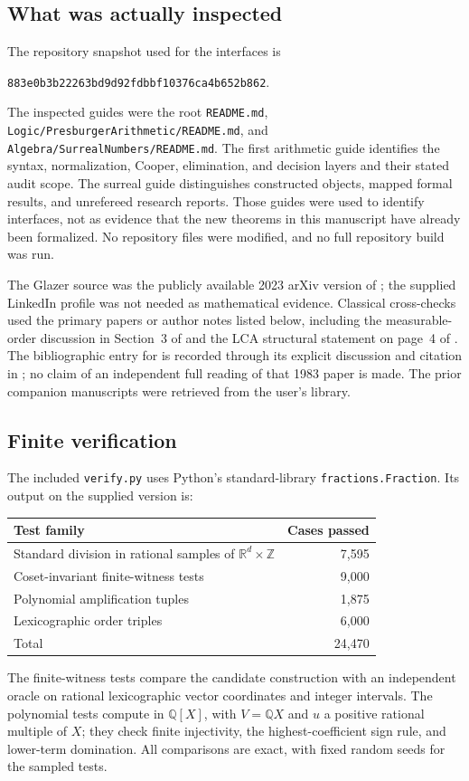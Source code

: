 \documentclass[11pt]{article}
\numberwithin{equation}{section}
\theoremstyle{definition}
\theoremstyle{remark}
\newcommand{\Z}{\mathbb Z}
\newcommand{\Q}{\mathbb Q}
\newcommand{\R}{\mathbb R}
\begin{document}
\subsection{What was actually inspected}
The repository snapshot used for the interfaces is
\begin{center}
\texttt{883e0b3b22263bd9d92fdbbf10376ca4b652b862}.
\end{center}
The inspected guides were the root \texttt{README.md},
\texttt{Logic/PresburgerArithmetic/README.md}, and
\texttt{Algebra/SurrealNumbers/README.md}. The first arithmetic guide
identifies the syntax, normalization, Cooper, elimination, and decision
layers and their stated audit scope. The surreal guide distinguishes
constructed objects, mapped formal results, and unrefereed research
reports. Those guides were used to identify interfaces, not as evidence
that the new theorems in this manuscript have already been formalized.
No repository files were modified, and no full repository build was run.

The Glazer source was the publicly available 2023 arXiv version of
\cite{Glazer}; the supplied LinkedIn profile was not needed as mathematical
evidence. Classical cross-checks used the primary papers or author notes
listed below, including the measurable-order discussion in Section~3
of \cite{AsmarMS} and the LCA structural statement on page~4 of
\cite{Dobben}. The bibliographic entry for \cite{HewittKoshi} is recorded
through its explicit discussion and citation in \cite{AsmarMS}; no
claim of an independent full reading of that 1983 paper is made.
The prior companion manuscripts were retrieved from the user's library.

\subsection{Finite verification}
The included \texttt{verify.py} uses Python's standard-library
\texttt{fractions.Fraction}. Its output on the supplied version is:
\begin{center}
\begin{tabular}{@{}lr@{}}
\toprule
Test family & Cases passed\\
\midrule
Standard division in rational samples of $\R^d\times\Z$ & 7,595\\
Coset-invariant finite-witness tests & 9,000\\
Polynomial amplification tuples & 1,875\\
Lexicographic order triples & 6,000\\
\midrule
Total & 24,470\\
\bottomrule
\end{tabular}
\end{center}
The finite-witness tests compare the candidate construction with an
independent oracle on rational lexicographic vector coordinates and
integer intervals. The polynomial tests compute in $\Q[X]$, with
$V=\Q X$ and $u$ a positive rational multiple of $X$; they check finite
injectivity, the highest-coefficient sign rule, and lower-term domination.
All comparisons are exact, with fixed random seeds for the sampled tests.
\end{document}
